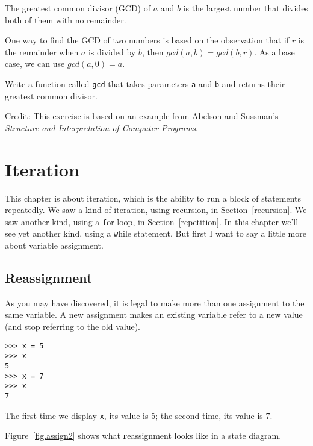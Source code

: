 \documentclass[
DIV=11,
fontsize=13,
twoside,
headinclude=false,
titlepage=firstiscover,
abstract=true,
headsepline=true,
footsepline=true,
chapterprefix=true, %
headings=big,
bibliography=totoc,%
captions=tableheading
]{scrbook}
\theoremstyle{definition}
\begin{document}
\begin{exercise}
\normalfont
{}

The greatest common divisor (GCD) of $a$ and $b$ is the largest number
that divides both of them with no remainder.  

One way to find the GCD of two numbers is based on the observation
that if $r$ is the remainder when $a$ is divided by $b$, then $gcd(a,
b) = gcd(b, r)$.  As a base case, we can use $gcd(a, 0) = a$.

Write a function called
\verb"gcd" that takes parameters {\texttt a} and {\texttt b}
and returns their greatest common divisor.

Credit: This exercise is based on an example from Abelson and
Sussman's {\em Structure and Interpretation of Computer Programs}.

\end{exercise}


\chapter{Iteration}

This chapter is about iteration, which is the ability to run
a block of statements repeatedly.  We saw a kind of iteration,
using recursion, in Section~\ref{recursion}.
We saw another kind, using a {\texttt for} loop,
in Section~\ref{repetition}.  In this chapter we'll see yet another
kind, using a {\texttt while} statement.
But first I want to say a little more about variable assignment.


\section{Reassignment}

As you may have discovered, it is legal to make more than one
assignment to the same variable.  A new assignment makes an existing
variable refer to a new value (and stop referring to the old value).

\begin{lstlisting}
>>> x = 5
>>> x
5
>>> x = 7
>>> x
7
\end{lstlisting}
%
The first time we display 
{\texttt x}, its value is 5; the second time, its
value is 7.

Figure~\ref{fig.assign2} shows what {\textbf reassignment} looks
like in a state diagram.  
\end{document}
